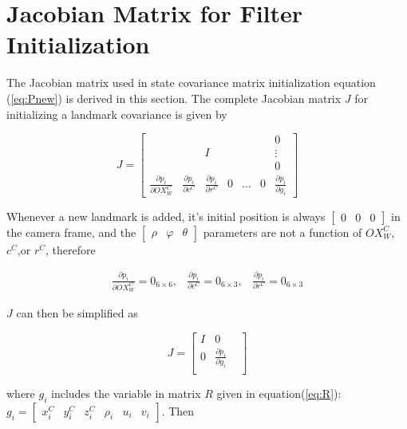 \chapter{Jacobian Matrix for Filter Initialization}\label{ch:appendix2}
The Jacobian matrix used in state covariance matrix initialization
equation (\ref{eq:Pnew}) is derived in this section. The complete
Jacobian matrix $J$ for initializing a landmark covariance is given by

\begin{equation}
J=\begin{bmatrix}
 & & & & & &0\\
 & &I& & & &\vdots\\ 
 & & & & & &0\\
\frac{\partial p_{i}}{\partial OX_{W}^{C}} &
\frac{\partial p_{i}}{\partial c^{C}} & 
\frac{\partial p_{i}}{\partial r^{C}} & 
0 & \ldots & 0 & 
\frac{\partial p_{i}}{\partial g_{i}} 
\end{bmatrix}
\end{equation}

\noindent Whenever a new landmark is added, it's initial position is
always $[\begin{matrix}0&0&0\end{matrix}]$ in the camera frame, and
the $[\begin{matrix}\rho&\varphi&\theta\end{matrix}]$ parameters are
not a function of $ OX_{W}^{C}$, $c^{C}$,or $r^{C}$, therefore

\begin{equation}
\begin{matrix}
\frac{\partial p_{i}}{\partial OX_{W}^{C}}=0_{6\times 6}, & 
\frac{\partial p_{i}}{\partial c^{C}}=0_{6\times 3}, &
\frac{\partial p_{i}}{\partial r^{C}}= 0_{6\times 3}
\end{matrix}
\end{equation}

\noindent $J$ can then be simplified as

\begin{equation}
J=\begin{bmatrix}
I & 0 & \\
0 & \frac{\partial p_{i}}{\partial g_{i}} & \\
\end{bmatrix} 
\end{equation}


\noindent where $g_{i}$ includes the variable in matrix $R$ given in
equation(\ref{eq:R}): $ g_{i}=[\begin{matrix} x_{i}^{C} & y_{i}^{C} &
  z_{i}^{C} & \rho _{i} & u_{i} & v_{i}\end{matrix}]$. Then 

